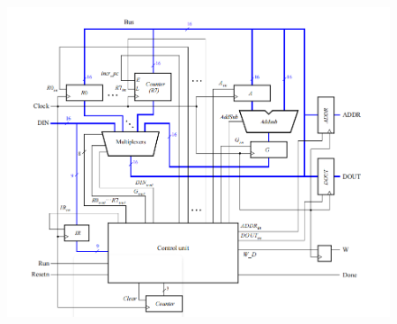 \begin{figure}[h]
    \centering
    \includegraphics[scale = 0.5]{source/picture/Lab10/pic3.png}
\end{figure}

